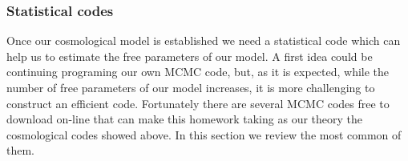 \documentclass[onecolumn,           %
               showpacs,            %
               preprintnumbers,     %
               aps,                 %
               prl,          	    %
               letterpaper,             %
               superscriptaddress,      %
               nofootinbib,         %
               tightenlines,        %
               floats,floatfix      %
               ,usenatbib,
               ]{revtex4-1}
\begin{document}





\subsubsection{Statistical codes}

Once our cosmological model is established we need a statistical code which can help us to estimate the free parameters of our model. A first idea could be continuing programing our own MCMC code, but, as it is expected, while the number of free parameters of our model increases, it is more challenging to construct an efficient code. Fortunately there are several MCMC codes free to download on-line that can make this homework taking as our theory the cosmological codes showed above. In this section we review the most common of them.
\end{document}
